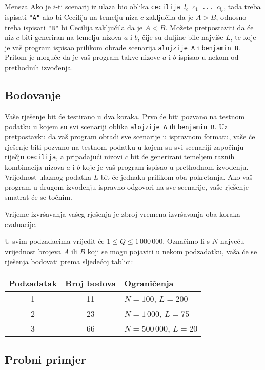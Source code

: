 \begin{statement}[
  problempoints=100,
  timelimit=1 sekunda,
  memorylimit=512 MiB,
]{Mensza}
Ako je $i$-ti scenarij iz ulaza bio oblika \texttt{cecilija $l_c$ $c_1$ ...
$c_{l_c}$}, tada treba ispisati \texttt{"A"} ako bi Cecilija na temelju niza
$c$ zaključila da je $A > B$, odnosno treba ispisati \texttt{"B"} bi Cecilija
zaključila da je $A < B$. Možete pretpostaviti da će niz $c$ biti generiran na
temelju nizova $a$ i $b$, čije su duljine bile najviše $L$, te  koje je vaš
program ispisao prilikom obrade scenarija \texttt{alojzije A} i
\texttt{benjamin B}. Pritom je moguće da je vaš program takve nizove $a$ i $b$
ispisao u nekom od prethodnih izvođenja.

\subsection*{Bodovanje}
Vaše rješenje bit će testirano u dva koraka. Prvo će biti pozvano na testnom
podatku u kojem su svi scenariji oblika \texttt{alojzije A} ili
\texttt{benjamin B}. Uz pretpostavku da vaš program obradi sve scenarije u
ispravnom formatu, vaše će rješenje biti pozvano na testnom podatku u kojem
su svi scenariji započinju riječju \texttt{cecilija}, a pripadajući nizovi $c$
bit će generirani temeljem raznih kombinacija nizova $a$ i $b$ koje je vaš
program ispisao u prethodnom izvođenju. Vrijednost ulaznog podatka $L$ bit će
jednaka prilikom oba pokretanja. Ako vaš program u drugom izvođenju ispravno
odgovori na sve scenarije, vaše rješenje smatrat će se točnim.

Vrijeme izvršavanja vašeg rješenja je zbroj vremena izvršavanja
oba koraka evaluacije.

U svim podzadacima vrijedit će $1 \le Q \le 1\,000\,000$. Označimo li s $N$
najveću vrijednost brojeva $A$ ili $B$ koji se mogu pojaviti u nekom podzadatku,
vaša će se rješenja bodovati prema sljedećoj tablici:

{\renewcommand{\arraystretch}{1.4}
  \setlength{\tabcolsep}{6pt}
  \begin{tabular}{ccl}
   Podzadatak & Broj bodova & Ograničenja \\ \midrule
    1 & 11 & $N = 100$, $L = 200$ \\
    2 & 23 & $N = 1\,000$, $L = 75$ \\
    3 & 66 & $N = 500\,000$, $L = 20$
\end{tabular}}

\subsection*{Probni primjer}

\end{statement}
